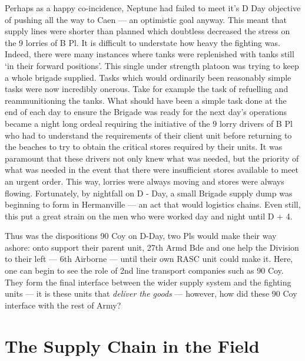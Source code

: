 \documentclass[noraggedright]{turabian-researchpaper}
\begin{document}
Perhaps as a happy co-incidence, Neptune had failed to meet it's D Day 
objective of pushing all the way to Caen --- an optimistic goal anyway.%
This meant that supply lines were shorter than planned which doubtless 
decreased the stress on the 9 lorries of B Pl.  
It is difficult to understate how heavy the 
fighting was.  Indeed, there were many instances where tanks were replenished
with tanks still `in their forward positions'.\autocite[2]{90wdjun}
This single under strength platoon was trying to keep a whole brigade supplied.
Tasks which would ordinarily been reasonably simple tasks were now incredibly
onerous.  Take for example the task of refuelling and reammunitioning the tanks.
What should have been a simple task done at the end of each day to ensure the
Brigade was ready for the next day's operations became a night long ordeal 
requiring the initiative of the 9 lorry drivers of B Pl who had to understand
the requirements of their client unit before returning to the beaches to try 
to obtain the critical stores required by their units.  It was paramount that
these drivers not only knew what was needed, but the priority of what was 
needed in the event that there were insufficient stores available to meet
an urgent order.  This way, lorries were always moving and stores were 
always flowing.  Fortunately, by nightfall on D - Day, a small Brigade supply
dump was beginning to form in Hermanville --- an act that would logistics 
chains.  Even still, this put a great strain on the men who were
worked day and night until D + 4.\autocite[2]{90wdjun}


Thus was the dispositions 90 Coy on D-Day, two Pls would make their way ashore:
onto support their parent unit, 27th Armd Bde and one help the Division to
their left --- 6th Airborne --- until their own RASC unit could make it. Here,
one can begin to see the role of 2nd line transport companies such as 90 Coy.  
They form the final interface between the wider supply system and the fighting
units ---  it is these units that \textit{deliver the goods} --- however, how
did these 90 Coy interface with the rest of Army?  


\section{The Supply Chain in the Field} 
\end{document}
